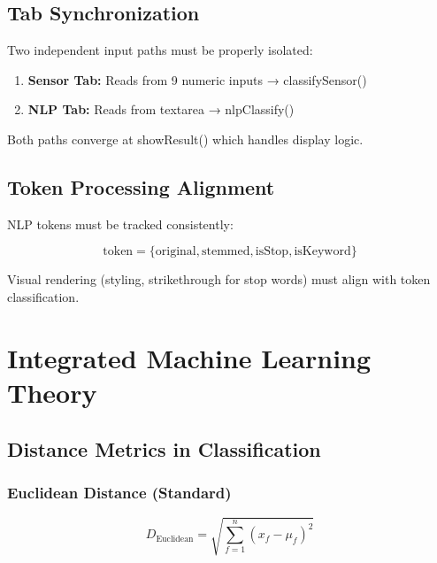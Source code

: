 \documentclass[10pt]{article}
\begin{document}
{\subsection{Tab Synchronization}

Two independent input paths must be properly isolated:

\begin{enumerate}
    \item \textbf{Sensor Tab:} Reads from 9 numeric inputs → classifySensor()
    \item \textbf{NLP Tab:} Reads from textarea → nlpClassify()
\end{enumerate}

Both paths converge at showResult() which handles display logic.

\subsection{Token Processing Alignment}

NLP tokens must be tracked consistently:

\begin{equation}
\text{token} = \{\text{original}, \text{stemmed}, \text{isStop}, \text{isKeyword}\}
\end{equation}

Visual rendering (styling, strikethrough for stop words) must align with token classification.


\section{Integrated Machine Learning Theory}

\subsection{Distance Metrics in Classification}

\subsubsection{Euclidean Distance (Standard)}

\begin{equation}
D_{\text{Euclidean}} = \sqrt{\sum_{f=1}^{n} (x_f - \mu_f)^2}
\end{equation}

}
\end{document}
